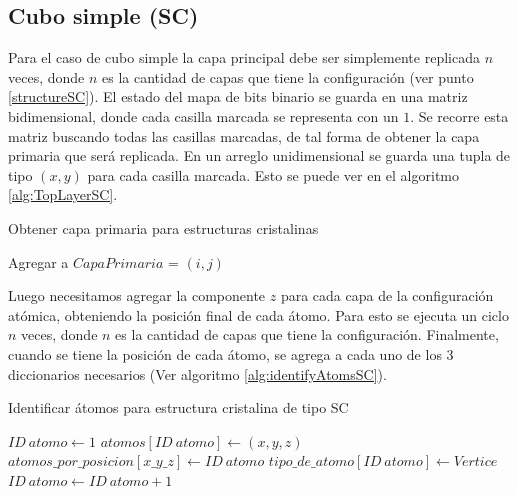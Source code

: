 \subsection{Cubo simple (SC)}

\label{identificacionAtomosSC}

Para el caso de cubo simple la capa principal debe ser simplemente replicada $n$ veces, donde $n$ es la cantidad de capas que tiene la configuración (ver punto \ref{structureSC}). El estado del mapa de bits binario se guarda en una matriz bidimensional, donde cada casilla marcada se representa con un $1$. Se recorre esta matriz buscando todas las casillas marcadas, de tal forma de obtener la capa primaria que será replicada. En un arreglo unidimensional se guarda una tupla de tipo $(x, y)$ para cada casilla marcada. Esto se puede ver en el algoritmo \ref{alg:TopLayerSC}.

\begin{algorithm}[ht]
  \caption{Obtener capa primaria para estructuras cristalinas}
  \label{alg:TopLayerSC}
  \begin{algorithmic}[1]
          \STATE Agregar a $CapaPrimaria$ = $(i, j)$
        \ENDIF
      \ENDFOR
    \ENDFOR
  \end{algorithmic}
\end{algorithm}

Luego necesitamos agregar la componente $z$ para cada capa de la configuración atómica, obteniendo la posición final de cada átomo. Para esto se ejecuta un ciclo $n$ veces, donde $n$ es la cantidad de capas que tiene la configuración. Finalmente, cuando se tiene la posición de cada átomo, se agrega a cada uno de los 3 diccionarios necesarios (Ver algoritmo \ref{alg:identifyAtomsSC}).

\begin{algorithm}[ht]
  \caption{Identificar átomos para estructura cristalina de tipo SC}
  \label{alg:identifyAtomsSC}
  \begin{algorithmic}[1]
    \STATE $ID\ atomo \leftarrow 1$
        \STATE $atomos[ID\ atomo] \leftarrow (x, y, z)$
        \STATE $atomos\_por\_posicion[x\_y\_z] \leftarrow ID\ atomo$
        \STATE $tipo\_de\_atomo[ID\ atomo] \leftarrow Vertice$
        \STATE $ID\ atomo \leftarrow ID\ atomo + 1$
      \ENDFOR
    \ENDFOR
  \end{algorithmic}
\end{algorithm}

